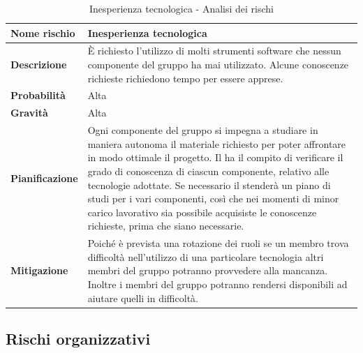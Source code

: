 \documentclass[12pt,a4paper]{article}
\begin{document}
\begin{table}[H]
	\begin{center}
		\begin{tabular}{p{} p{}}
			\toprule
			\textbf{Nome rischio} & \textbf{Inesperienza tecnologica} \\
			\midrule
			\midrule
			\textbf{Descrizione} & È richiesto l’utilizzo di molti strumenti software che nessun componente del gruppo ha mai utilizzato. Alcune conoscenze richieste richiedono tempo per
			essere apprese. \\
			\midrule
			\textbf{Probabilità} & Alta \\
			\midrule
			\textbf{Gravità} & Alta \\
			\midrule
			\textbf{Pianificazione} & Ogni componente del gruppo si impegna a studiare in maniera autonoma il materiale richiesto per poter affrontare in modo ottimale il progetto. Il \PM{} ha il compito di verificare il grado di conoscenza di ciascun componente, relativo alle tecnologie adottate. Se necessario il \PM{} stenderà un piano di studi per i vari componenti, così che nei momenti di minor carico lavorativo sia possibile acquisiste le conoscenze richieste, prima che siano necessarie. \\
			\midrule
			\textbf{Mitigazione} & Poiché è prevista una rotazione dei ruoli se un membro trova difficoltà nell'utilizzo di una particolare tecnologia altri membri del gruppo potranno provvedere alla mancanza. Inoltre i membri del gruppo potranno rendersi disponibili ad aiutare quelli in difficoltà. \\
			\bottomrule
		\end{tabular}
		\caption{Inesperienza tecnologica - Analisi dei rischi}
	\end{center}
\end{table}

\subsection{Rischi organizzativi}
\end{document}
